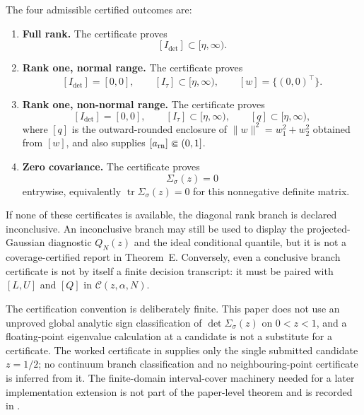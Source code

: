 \begin{definition}
The four admissible certified outcomes are:
\begin{enumerate}[label=\textup{(\alph*)},leftmargin=2.4em,itemsep=0.25em]
\item \textbf{Full rank.}  The certificate proves
\[
[I_{\det}]\subset[\eta,\infty).
\]
\item \textbf{Rank one, normal range.}  The certificate proves
\[
[I_{\det}]=[0,0],\qquad
[I_{\tau}]\subset[\eta,\infty),\qquad
[w]=\{(0,0)^\top\}.
\]
\item \textbf{Rank one, non-normal range.}  The certificate proves
\[
[I_{\det}]=[0,0],\qquad
[I_{\tau}]\subset[\eta,\infty),\qquad
[q]\subset[\eta,\infty),
\]
where \([q]\) is the outward-rounded enclosure of
\(\|w\|^2=w_1^2+w_2^2\) obtained from \([w]\), and also supplies
\([a_{\rm rn}]\Subset(0,1]\).
\item \textbf{Zero covariance.}  The certificate proves
\[
\Sigma_\sigma(z)=0
\]
entrywise, equivalently \(\operatorname{tr}\Sigma_\sigma(z)=0\) for this
nonnegative definite matrix.
\end{enumerate}
If none of these certificates is available, the diagonal rank branch is
declared inconclusive.  An inconclusive branch may still be used to display the
projected-Gaussian diagnostic \(Q_N(z)\) and the ideal conditional quantile,
but it is not a coverage-certified report in Theorem~E.  Conversely, even a
conclusive branch certificate is not by itself a finite decision transcript:
it must be paired with \([L,U]\) and \([Q]\) in
\(\mathcal C(z,\alpha,N)\).

The certification convention is deliberately finite.  This paper does not use
an unproved global analytic sign classification of
\(\det\Sigma_\sigma(z)\) on \(0<z<1\), and a floating-point eigenvalue
calculation at a candidate is not a substitute for a certificate.  The worked
certificate in  supplies only
the single submitted candidate \(z=1/2\); no continuum branch classification
and no neighbouring-point certificate is inferred from it.  The finite-domain
interval-cover machinery needed for a later implementation extension is not
part of the paper-level theorem and is recorded in
.
\end{definition}

